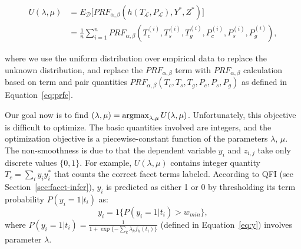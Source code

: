 \begin{equation}
\begin{split}
 U(\lambda,\mu) &= E_\mathcal{D}\big[P\!R\!F_{\alpha,\beta}(h(T_\mathcal{L},P_\mathcal{L}),Y^*,Z^*)\big] \\
 &=\frac{1}{n}\sum_{i=1}^{n}P\!R\!F_{\alpha,\beta}(T_c^{(i)},T_s^{(i)},T_g^{(i)},P_c^{(i)},P_s^{(i)},P_g^{(i)}),
\end{split}
\end{equation}

where we use the uniform distribution over empirical data to replace the unknown distribution, and replace the $P\!R\!F_{\alpha,\beta}$ term with $P\!R\!F_{\alpha,\beta}$ calculation based on term and pair quantities $P\!R\!F_{\alpha,\beta}(T_c,T_s,T_g,P_c,P_s,P_g)$ as defined in Equation~\ref{eq:prfc}. 

Our goal now is to find $(\lambda,\mu)=\operatorname*{argmax}_{\lambda,\mu}{U(\lambda,\mu)}$. Unfortunately, this objective is difficult to optimize. The basic quantities involved are integers, and the optimization objective is a piecewise-constant function of the parameters $\lambda$, $\mu$. The non-smoothness is due to that the dependent variable $y_i$ and $z_{i,j}$ take only discrete values $\{0,1\}$. For example, $U(\lambda,\mu)$ contains integer quantity $T_c=\sum_i{y_iy_i^{*}}$ that counts the correct facet terms labeled. According to QFI (see Section~\ref{sec:facet-infer}), $y_i$ is predicted as either 1 or 0 by thresholding its term probability $P(y_i=1|t_i)$ as:
\begin{equation}
 y_i = 1\{P(y_i=1|t_i)>w_{min}\},
\end{equation}
where $P(y_i=1|t_i)=\frac{1}{1+\exp\{-\sum_k{\lambda_k f_k(t_i)}\}}$ (defined in Equation~\ref{eq:y}) involves parameter $\lambda$.

